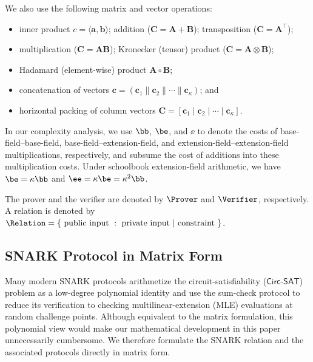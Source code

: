 We also use the following matrix and vector operations:
\begin{itemize}[noitemsep, topsep = 0pt]
\item inner product $c = \langle \bm a, \bm b \rangle$; addition ($\bm C = \bm A + \bm B$); transposition ($\bm C = \bm A^\top$);
\item multiplication
($\bm C = \bm A\bm B$); Kronecker (tensor) product ($\bm C = \bm A \otimes \bm B$);
\item Hadamard (element-wise) product $\bm{A} \circ \bm{B}$;
\item concatenation of vectors $\bm{c} = (\bm c_1 \| \bm c_2 \|\cdots \| \bm c_\kappa)$; and
\item horizontal packing of column vectors $\bm C = [\bm c_1 \mid \bm c_2 \mid \cdots \mid \bm c_\kappa]$.
\end{itemize}
    
In our complexity analysis, we use \(\bb\), \(\be\), and \(\ee\)
to denote the costs of base-field--base-field,
base-field--extension-field, and extension-field--extension-field
multiplications, respectively, and subsume the cost of additions
into these multiplication costs. Under schoolbook extension-field
arithmetic, we have
\(
    \be=\kappa\bb
\) and
\(
    \ee=\kappa\be=\kappa^2\bb
\).


The prover and the verifier are denoted by $\Prover$ and $\Verifier$, respectively. 
A relation is denoted by $\Relation = \{\text{ public input }:\text{ private input }| \text{ constraint }\}$.

\subsection{SNARK Protocol in Matrix Form}
\label{sec:defgeneral}
Many modern SNARK protocols arithmetize the circuit-satisfiability
(\(\mathsf{Circ\text{-}SAT}\)) problem as a low-degree polynomial
identity and use the sum-check protocol to reduce its verification
to checking multilinear-extension (MLE) evaluations at random
challenge points.
Although equivalent to the matrix formulation,
this polynomial view would make our mathematical development in this paper unnecessarily cumbersome.
We therefore formulate the SNARK relation and the associated protocols directly in matrix form.


